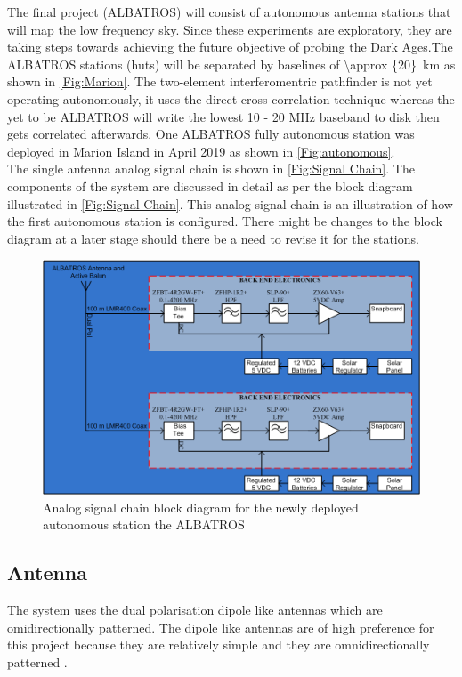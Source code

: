 \documentclass{ws-jai}
\begin{document}
The final project (ALBATROS) will consist of autonomous antenna stations that will map the low frequency sky. Since these experiments are exploratory, they are taking steps towards achieving the future objective of probing the Dark Ages.The ALBATROS stations (huts) will be separated by baselines of \SI{\approx {20}}{km} as shown in \autoref{Fig:Marion}. The two-element interferomentric pathfinder is not yet operating autonomously, it uses the direct cross correlation technique whereas the yet to be ALBATROS will write the lowest 10 - 20 MHz baseband to disk then gets correlated afterwards. One ALBATROS fully autonomous station was deployed in Marion Island in April 2019 as shown in \autoref{Fig:autonomous}. \\

The single antenna analog signal chain is shown in \autoref{Fig:Signal Chain}. The components of the system are discussed in detail as per the block diagram illustrated in \autoref{Fig:Signal Chain}. This analog signal chain is an illustration of how the first autonomous station is configured. There might be changes to the block diagram at a later stage should there be a need to revise it for the stations.

\begin{figure}[h]
	\begin{center}
		\includegraphics[width=0.7\linewidth]{Figures/Signal-Chain.png}
		\caption{Analog signal chain block diagram for the newly deployed autonomous station the ALBATROS}
		\label{Fig:Signal Chain}
	\end{center}
\end{figure}

\subsection{Antenna}	
The system uses the dual polarisation dipole like antennas which are omidirectionally patterned. The dipole like antennas are of high preference for this project because they are relatively simple and they are omnidirectionally patterned \cite{Memo28}.
\end{document}

